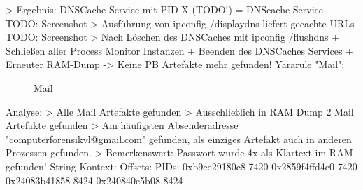 		> Ergebnis: DNSCache Service mit PID X (TODO!) = DNScache Service
			TODO: Screenshot
		> Ausführung von ipconfig /displaydns liefert gecachte URLs
			TODO: Screenshot
		> Nach Löschen des DNSCaches mit ipconfig /flushdns + Schließen aller Process Monitor Instanzen + Beenden des DNSCaches Services + Erneuter RAM-Dump -> Keine PB Artefakte mehr gefunden!
Yararule "Mail":
	\begin{figure}[h!]
		\centerline{}
		\label{chart:final-criteria}  
		\caption{Mail}
	\end{figure}
	Analyse:
		> Alle Mail Artefakte gefunden
		> Ausschließlich in RAM Dump 2 Mail Artefakte gefunden
		> Am häufigsten Absenderadresse "computerforensikvl@gmail.com" gefunden, als einziges Artefakt auch in anderen Prozessen gefunden.
		> Bemerkenswert: Passwort wurde 4x als Klartext im RAM gefunden!
			String Kontext:
				Offsets:		PIDs:
				0xb9ce29180c8	7420
				0x2859f4ffd4e0	7420
				0x24083b41858	8424
				0x240840e5b08	8424
				
